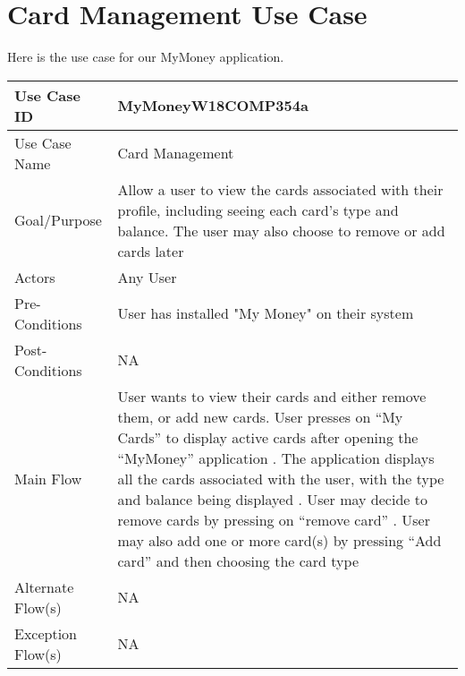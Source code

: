 \documentclass{article}
\begin{document}
\section{Card Management Use Case}
Here is the use case for our MyMoney application.

\medskip
\begin{center}
\begin{tabular}{| l | p{10cm} |}
\hline

Use Case ID  & MyMoneyW18COMP354a\\
\hline
Use Case Name  & Card Management\\
\hline
Goal/Purpose  & Allow a user to view the cards associated with their profile, including seeing each card's type and balance. The user may also choose to remove or add cards later\\
\hline
Actors  & Any User\\
\hline
Pre-Conditions &  User has installed "My Money" on their system \\
\hline
Post-Conditions & NA \\
\hline
Main Flow & User wants to view their cards and either remove them, or add new cards\newline
1.	User presses on “My Cards” to display active cards after opening the “MyMoney” application \newline
2.	The application displays all the cards associated with the user, with the type and balance being displayed \newline
3.	User may decide to remove cards by pressing on “remove card” \newline
4.	User may also add one or more card(s) by pressing “Add card” and then choosing the card type \newline
\\
\hline
Alternate Flow(s) & NA

\\
\hline
Exception Flow(s) & NA \\
\hline

\end{tabular}
\end{center}
\end{document}
